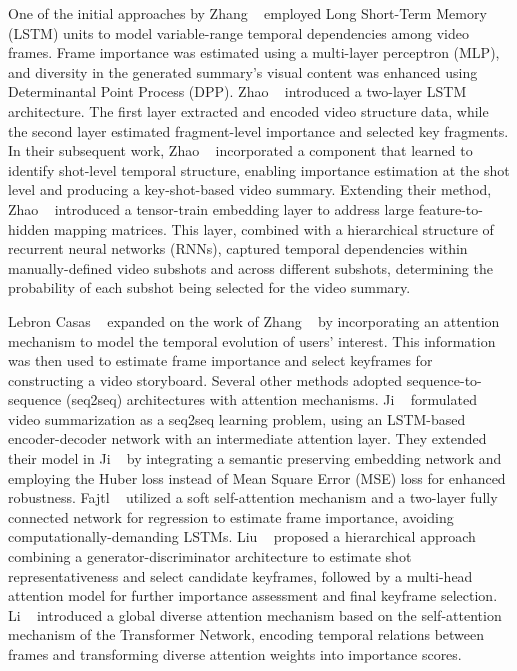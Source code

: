 One of the initial approaches by Zhang \etal~\cite{zhang2016lstm} employed Long Short-Term Memory (LSTM) units to model variable-range temporal dependencies among video frames. Frame importance was estimated using a multi-layer perceptron (MLP), and diversity in the generated summary's visual content was enhanced using Determinantal Point Process (DPP). Zhao \etal~\cite{zhao2017hierarchical} introduced a two-layer LSTM architecture. The first layer extracted and encoded video structure data, while the second layer estimated fragment-level importance and selected key fragments. In their subsequent work, Zhao \etal~\cite{zhao2018hsa} incorporated a component that learned to identify shot-level temporal structure, enabling importance estimation at the shot level and producing a key-shot-based video summary. Extending their method, Zhao \etal~\cite{zhao2020tth} introduced a tensor-train embedding layer to address large feature-to-hidden mapping matrices. This layer, combined with a hierarchical structure of recurrent neural networks (RNNs), captured temporal dependencies within manually-defined video subshots and across different subshots, determining the probability of each subshot being selected for the video summary.

Lebron Casas \etal~\cite{lebron2019attention} expanded on the work of Zhang \etal~\cite{zhang2016lstm} by incorporating an attention mechanism to model the temporal evolution of users' interest. This information was then used to estimate frame importance and select keyframes for constructing a video storyboard. Several other methods adopted sequence-to-sequence (seq2seq) architectures with attention mechanisms. Ji \etal~\cite{ji2019attentionEnDe} formulated video summarization as a seq2seq learning problem, using an LSTM-based encoder-decoder network with an intermediate attention layer. They extended their model in Ji \etal~\cite{ji2020deep} by integrating a semantic preserving embedding network and employing the Huber loss instead of Mean Square Error (MSE) loss for enhanced robustness. Fajtl \etal~\cite{fajtl2019summarizing} utilized a soft self-attention mechanism and a two-layer fully connected network for regression to estimate frame importance, avoiding computationally-demanding LSTMs. Liu \etal~\cite{liu2019learning} proposed a hierarchical approach combining a generator-discriminator architecture to estimate shot representativeness and select candidate keyframes, followed by a multi-head attention model for further importance assessment and final keyframe selection. Li \etal~\cite{li2021exploring} introduced a global diverse attention mechanism based on the self-attention mechanism of the Transformer Network, encoding temporal relations between frames and transforming diverse attention weights into importance scores.

